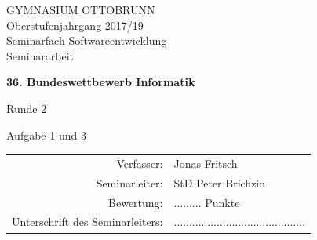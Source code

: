 \documentclass[a4paper,12pt]{article}
\begin{document}
\parindent0cm
\setlength{\abovedisplayskip}{-1cm}
\setlength{\belowdisplayskip}{0.75cm}


\thispagestyle{empty}

\begin{center}

\begin{large} 
GYMNASIUM OTTOBRUNN	\\
\vspace{1cm}
Oberstufenjahrgang 2017/19\\
\vspace{1cm}
Seminarfach Softwareentwicklung\\
\vspace{2cm}
Seminararbeit\\
\end{large}


\vspace{1cm}


{\Huge\bfseries 
36. Bundeswettbewerb Informatik\par
Runde 2\par
Aufgabe 1 und 3\par 
}


\vspace{2cm}


\begin{large}
\begin{tabular}{rl}
Verfasser:& Jonas Fritsch \\
Seminarleiter: & StD Peter Brichzin \\
Bewertung:  & ......... Punkte  \\
Unterschrift des Seminarleiters: & ...........................................  \\
\end{tabular} 
\end{large}

\end{center}


\newpage
\end{document}
